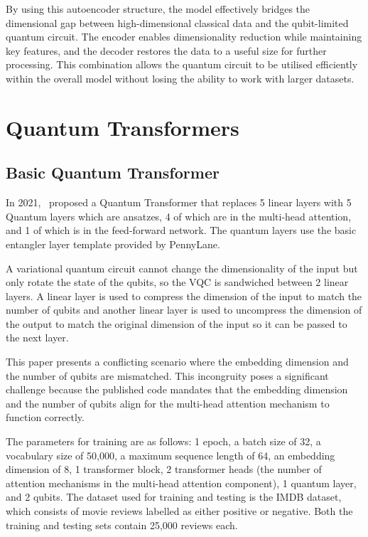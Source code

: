 By using this autoencoder structure, the model effectively bridges
the dimensional gap between high-dimensional classical data and the
qubit-limited quantum circuit. The encoder enables dimensionality
reduction while maintaining key features, and the decoder restores
the data to a useful size for further processing. This combination
allows the quantum circuit to be utilised efficiently within the
overall model without losing the ability to work with larger datasets.

\section{Quantum Transformers}
\label{sec:quantum_transformers}

\subsection{Basic Quantum Transformer}
\label{subsec:basic_quantum_transformer}
In 2021,~\citet{disipio2021dawn} proposed a Quantum Transformer that
replaces 5 linear layers with 5 Quantum layers which are ansatzes, 4
of which are in the multi-head attention, and 1 of which is in the
feed-forward network. The quantum layers use the basic entangler
layer template provided by PennyLane.

A variational quantum circuit cannot change the dimensionality of the
input but only rotate the state of the qubits, so the VQC is
sandwiched between 2 linear layers. A linear layer is used to
compress the dimension of the input to match the number of qubits and
another linear layer is used to uncompress the dimension of the
output to match the original dimension of the input so it can be
passed to the next layer.

This paper presents a conflicting scenario where the embedding
dimension and the number of qubits are mismatched. This incongruity
poses a significant challenge because the published code mandates
that the embedding dimension and the number of qubits align for the
multi-head attention mechanism to function correctly.

The parameters for training are as follows: 1 epoch, a batch size of
32, a vocabulary size of 50,000, a maximum sequence length of 64, an
embedding dimension of 8, 1 transformer block, 2 transformer heads
(the number of attention mechanisms in the multi-head attention
component), 1 quantum layer, and 2 qubits. The dataset used for
training and testing is the IMDB dataset, which consists of movie
reviews labelled as either positive or negative. Both the training
and testing sets contain 25,000 reviews each.

